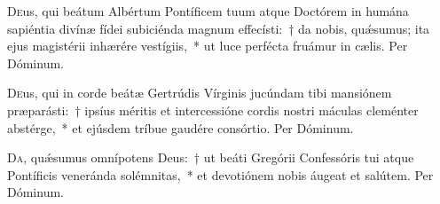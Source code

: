 \documentclass[vesperale_romanum]{subfiles}
\begin{document}

\capitdeseq

\myrule


\duplex



\oratio

\lettrine{D}{e}us, qui beátum Albértum Pontíficem tuum atque Do\-ctórem in humána sapiéntia divínæ fídei subiciénda magnum effecísti:~† da nobis, quǽsumus; ita ejus magistérii inhærére vestígiis,~* ut luce perfécta fruámur in cælis. Per Dóminum.

\capitdeseq

\myrule


\duplex

\oratio

\lettrine{D}{e}us, qui in corde beátæ Gertrúdis Vírginis jucúndam tibi mansiónem præparásti:~† ipsíus méritis et intercessióne cordis nostri máculas cleménter abstérge,~* et ejúsdem tríbue gaudére consórtio. Per Dóminum.


\commsequentis

\myrule


\semiduplex


\oratio

\lettrine{D}{a}, quǽsumus omnípotens Deus:~† ut beáti Gregórii Confessóris tui atque Pontíficis veneránda solé\-mnitas,~* et devotiónem nobis áugeat et salútem.
Per Dóminum.

\myrule

\end{document}
